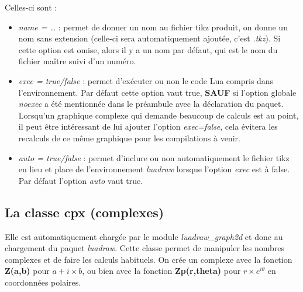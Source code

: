 Celles-ci sont :
\begin{itemize}
\item \emph{name = \ldots{}} : permet de donner un nom au fichier tikz produit, on donne un nom sans extension (celle-ci sera automatiquement ajoutée, c'est \emph{.tkz}). Si cette option est omise, alors il y a un nom par défaut, qui est le nom du fichier maître suivi d'un numéro.
\item \emph{exec = true/false} : permet d'exécuter ou non le code Lua compris dans l'environnement. Par défaut cette option vaut true, \textbf{SAUF} si l'option globale \emph{noexec} a été mentionnée dans le préambule avec la déclaration du paquet. Lorsqu'un graphique complexe qui demande beaucoup de calculs est au point, il peut être intéressant de lui ajouter l'option \emph{exec=false}, cela évitera les recalculs de ce même graphique pour les compilations à venir.
\item \emph{auto = true/false} : permet d'inclure ou non automatiquement le fichier tikz en lieu et place de l'environnement \emph{luadraw} lorsque l'option \emph{exec} est à false. Par défaut l'option \emph{auto} vaut true.
\end{itemize}


\subsection{La classe cpx (complexes)}

Elle est automatiquement chargée par le module \emph{luadraw\_graph2d} et donc au chargement du paquet \emph{luadraw}. Cette classe permet de manipuler les nombres complexes et de faire les calculs habituels. On crée un complexe avec la fonction \textbf{Z(a,b)} pour \(a+i\times b\), ou bien avec la fonction \textbf{Zp(r,theta)} pour \(r\times e^{i\theta}\) en coordonnées polaires.

